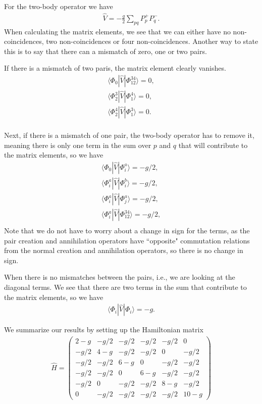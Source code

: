 \documentclass[a4paper, 11pt, notitlepage, english]{article}
\newcommand{\op}[1]{\hat{#1}}
\newcommand{\braopket}[3]{\langle #1 | {#2} | #3 \rangle}
\begin{document}
For the two-body operator we have
\begin{align*}
\op{V} = -\frac{g}{2}\sum_{pq} P_p^+ P_q^-.
\end{align*}
When calculating the matrix elements, we see that we can either have no non-coincidences, two non-coincidences or four non-coincidences. Another way to state this is to say that there can a mismatch of zero, one or two pairs. 

If there is a mismatch of two paris, the matrix element clearly vanishes.
\begin{align*}
\braopket{\Phi_0}{\op{V}}{\Phi_{12}^{34}} = 0, \\
\braopket{\Phi_2^3}{\op{V}}{\Phi_{1}^{4}} = 0, \\
\braopket{\Phi_2^4}{\op{V}}{\Phi_{1}^{3}} = 0. \\
\end{align*}

Next, if there is a mismatch of one pair, the two-body operator has to remove it, meaning there is only one term in the sum over $p$ and $q$ that will contribute to the matrix elements, so we have
\begin{align*}
\braopket{\Phi_0}{\op{V}}{\Phi_i^a} = -g/2, \\
\braopket{\Phi_i^a}{\op{V}}{\Phi_i^{b}} = -g/2, \\
\braopket{\Phi_i^a}{\op{V}}{\Phi_j^{a}} = -g/2, \\
\braopket{\Phi_i^a}{\op{V}}{\Phi_{12}^{34}} = -g/2, \\
\end{align*}
Note that we do not have to worry about a change in sign for the terms, as the pair creation and annihilation operators have ``opposite" commutation relations from the normal creation and annihilation operators, so there is no change in sign.

When there is no mismatches between the pairs, i.e., we are looking at the diagonal terms. We see that there are two terms in the sum that contribute to the matrix elements, so we have
\begin{align*}
\braopket{\Phi_i}{\op{V}}{\Phi_i} = -g.
\end{align*}

We summarize our results by setting up the Hamiltonian matrix
\begin{align*}
\op{H} = \begin{pmatrix}
2 - g &  -g/2 & -g/2  & -g/2  & -g/2  & 0     \\
-g/2  & 4 - g & -g/2  & -g/2  & 0     & -g/2  \\
-g/2  & -g/2  & 6 - g &	0     & -g/2  & -g/2  \\              
-g/2  & -g/2  & 0     & 6 - g &	-g/2  & -g/2  \\                         
-g/2  &	0	  & -g/2  & -g/2  & 8 - g & -g/2  \\
0     &  -g/2 & -g/2  & -g/2  &  -g/2 & 10 - g 
\end{pmatrix}
\end{align*}
\end{document}
